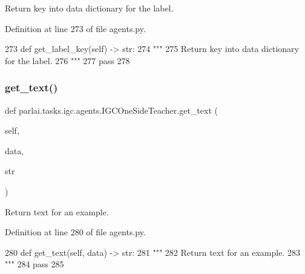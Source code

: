 \begin{DoxyVerb}Return key into data dictionary for the label.
\end{DoxyVerb}
 

Definition at line 273 of file agents.\+py.


\begin{DoxyCode}
273     \textcolor{keyword}{def }get\_label\_key(self) -> str:
274         \textcolor{stringliteral}{"""}
275 \textcolor{stringliteral}{        Return key into data dictionary for the label.}
276 \textcolor{stringliteral}{        """}
277         \textcolor{keywordflow}{pass}
278 
\end{DoxyCode}
\mbox{\label{classparlai_1_1tasks_1_1igc_1_1agents_1_1IGCOneSideTeacher_aa237039dbe3c14c4210f5806f2aa9c5c}} 
\subsubsection{\texorpdfstring{get\+\_\+text()}{get\_text()}}
{\footnotesize\ttfamily def parlai.\+tasks.\+igc.\+agents.\+I\+G\+C\+One\+Side\+Teacher.\+get\+\_\+text (\begin{DoxyParamCaption}\item[{}]{self,  }\item[{}]{data,  }\item[{}]{str }\end{DoxyParamCaption})}

\begin{DoxyVerb}Return text for an example.
\end{DoxyVerb}
 

Definition at line 280 of file agents.\+py.


\begin{DoxyCode}
280     \textcolor{keyword}{def }get\_text(self, data) -> str:
281         \textcolor{stringliteral}{"""}
282 \textcolor{stringliteral}{        Return text for an example.}
283 \textcolor{stringliteral}{        """}
284         \textcolor{keywordflow}{pass}
285 
\end{DoxyCode}
\mbox{\label{classparlai_1_1tasks_1_1igc_1_1agents_1_1IGCOneSideTeacher_acd2f7b3686dfb0223b513f5fbf5d59db}} 
